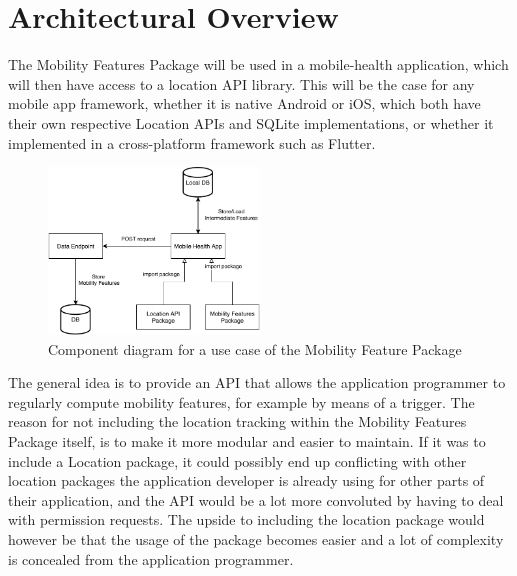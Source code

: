 \section{Architectural Overview}
The Mobility Features Package will be used in a mobile-health application, which will then have access to a location API library. This will be the case for any mobile app framework, whether it is native Android or iOS, which both have their own respective Location APIs and SQLite implementations, or whether it implemented in a cross-platform framework such as Flutter. 


\begin{figure}[h]
    \centering
    \includegraphics[width=0.5\textwidth]{images/diagrams/data-flow.pdf}
    \caption{Component diagram for a use case of the Mobility Feature Package}
    \label{fig:component-diagram}
\end{figure}

The general idea is to provide an API that allows the application programmer to regularly compute mobility features, for example by means of a trigger. The reason for not including the location tracking within the Mobility Features Package itself, is to make it more modular and easier to maintain. If it was to include a Location package, it could possibly end up conflicting with other location packages the application developer is already using for other parts of their application, and the API would be a lot more convoluted by having to deal with permission requests. The upside to including the location package would however be that the usage of the package becomes easier and a lot of complexity is concealed from the application programmer. 

